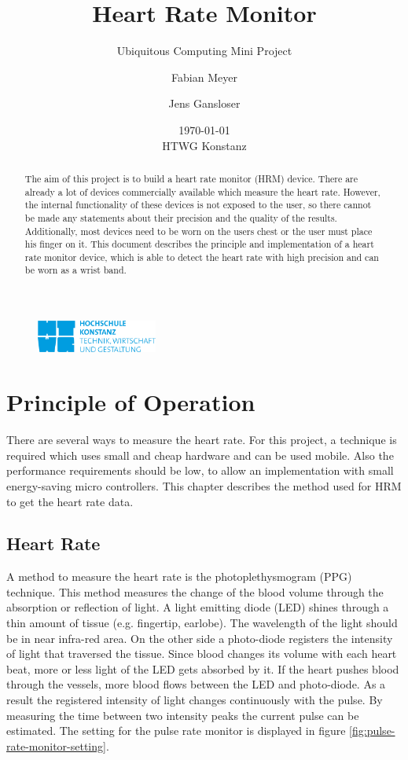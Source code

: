 \documentclass[notitlepage]{scrreprt}
\begin{document}
\title{Heart Rate Monitor}
\subtitle{Ubiquitous Computing Mini Project}
\author{Fabian Meyer \and Jens Gansloser}
\date{\today \\ HTWG Konstanz}
\maketitle

\begin{figure}[H]
	\centering
	\includegraphics[width=150px]{images/htwgLogo.jpg}
\end{figure}

\begin{abstract}
The aim of this project is to build a heart rate monitor (HRM) device. There are already a lot of devices commercially available which measure the heart rate. However, the internal functionality of these devices is not exposed to the user, so there cannot be made any statements about their precision and the quality of the results. Additionally, most devices need to be worn on the users chest or the user must place his finger on it. This document describes the principle and implementation of a heart rate monitor device, which is able to detect the heart rate with high precision and can be worn as a wrist band.
\end{abstract}
\clearpage

\tableofcontents

\chapter{Principle of Operation}
\label{chap:principle-of-operation}

There are several ways to measure the heart rate. For this project, a technique is required which uses small and cheap hardware and can be used mobile. Also the performance requirements should be low, to allow an implementation with small energy-saving micro controllers. This chapter describes the method used for HRM to get the heart rate data.

\section{Heart Rate}
A method to measure the heart rate is the photoplethysmogram (PPG) technique. This method measures the change of the blood volume through the absorption or reflection of light. A light emitting diode (LED) shines through a thin amount of tissue (e.g. fingertip, earlobe). The wavelength of the light should be in near infra-red area. On the other side a photo-diode registers the intensity of light that traversed the tissue. Since blood changes its volume with each heart beat, more or less light of the LED gets absorbed by it. If the heart pushes blood through the vessels, more blood flows between the LED and photo-diode. As a result the registered intensity of light changes continuously with the pulse. By measuring the time between two intensity peaks the current pulse can be estimated. The setting for the pulse rate monitor is displayed in figure \ref{fig:pulse-rate-monitor-setting}.
\end{document}
